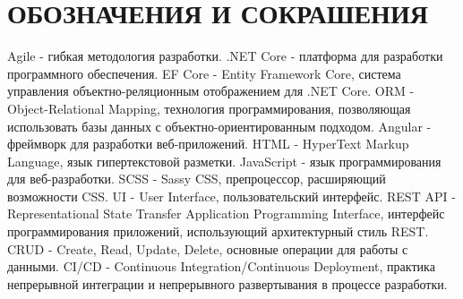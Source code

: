 \section*{ОБОЗНАЧЕНИЯ И СОКРАШЕНИЯ}

Agile -\- гибкая методология разработки.
.NET Core -\- платформа для разработки программного обеспечения.
EF Core -\- Entity Framework Core, система управления объектно-реляционным отображением для .NET Core.
ORM -\- Object-Relational Mapping, технология программирования, позволяющая использовать базы данных с объектно-ориентированным подходом.
Angular -\- фреймворк для разработки веб-приложений.
HTML -\- HyperText Markup Language, язык гипертекстовой разметки.
JavaScript -\- язык программирования для веб-разработки.
SCSS -\- Sassy CSS, препроцессор, расширяющий возможности CSS.
UI -\- User Interface, пользовательский интерфейс.
REST API -\- Representational State Transfer Application Programming Interface, интерфейс программирования приложений, использующий архитектурный стиль REST.
CRUD -\- Create, Read, Update, Delete, основные операции для работы с данными.
CI/CD -\- Continuous Integration/Continuous Deployment, практика непрерывной интеграции и непрерывного развертывания в процессе разработки.
